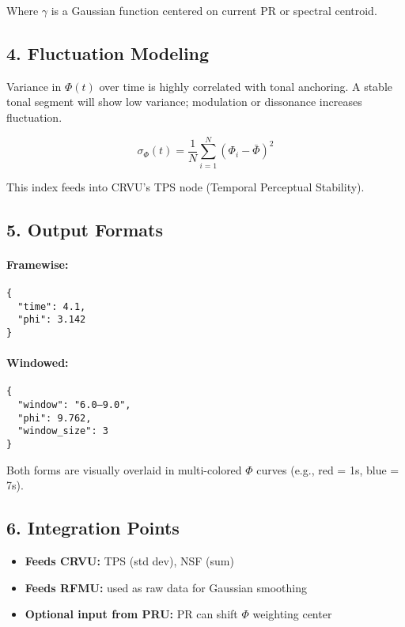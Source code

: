 Where $\gamma$ is a Gaussian function centered on current PR or spectral centroid.

\subsection*{4. Fluctuation Modeling}

Variance in $\Phi(t)$ over time is highly correlated with tonal anchoring. A stable tonal segment will show low variance; modulation or dissonance increases fluctuation.

\[
\sigma_\Phi(t) = \frac{1}{N} \sum_{i=1}^N \left( \Phi_i - \bar{\Phi} \right)^2
\]

This index feeds into CRVU's TPS node (Temporal Perceptual Stability).

\subsection*{5. Output Formats}

\paragraph{Framewise:}
\begin{verbatim}
{
  "time": 4.1,
  "phi": 3.142
}
\end{verbatim}

\paragraph{Windowed:}
\begin{verbatim}
{
  "window": "6.0–9.0",
  "phi": 9.762,
  "window_size": 3
}
\end{verbatim}

Both forms are visually overlaid in multi-colored $\Phi$ curves (e.g., red = 1s, blue = 7s).

\subsection*{6. Integration Points}

\begin{itemize}
    \item \textbf{Feeds CRVU:} TPS (std dev), NSF (sum)
    \item \textbf{Feeds RFMU:} used as raw data for Gaussian smoothing
    \item \textbf{Optional input from PRU:} PR can shift $\Phi$ weighting center
\end{itemize}

